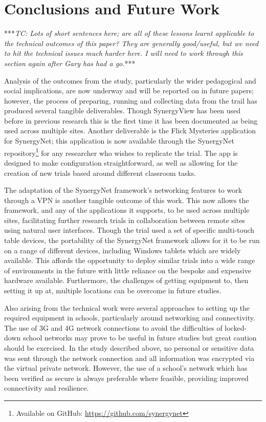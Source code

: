 \documentclass[a4paper,11pt]{article}
\begin{document}
\section{Conclusions and Future Work}

***{\emph{TC: Lots of short sentences here; are all of these lessons learnt applicable to the technical outcomes of this paper? They are generally good/useful, but we need to hit the technical issues much harder here. I will need to work through this section again after Gary has had a go.}}***

Analysis of the outcomes from the study, particularly the wider pedagogical and social implications, are now underway and will be reported on in future papers; however, the process of preparing, running and collecting data from the trail has produced several tangible deliverables.
Though SynergyView has been used before in previous research this is the first time it has been documented as being used across multiple sites.
Another deliverable is the Flick Mysteries application for SynergyNet; this application is now available through the SynergyNet repository\footnote{Available on GitHub: \url{https://github.com/synergynet}} for any researcher who wishes to replicate the trial.
The app is designed to make configuration straightforward, as well as allowing for the creation of new trials based around different classroom tasks.

The adaptation of the SynergyNet framework's networking features to work through a VPN is another tangible outcome of this work.
This now allows the framework, and any of the applications it supports, to be used across multiple sites, facilitating further research trials in collaboration between remote sites using natural user interfaces.
Though the trial used a set of specific multi-touch table devices, the portability of the SynergyNet framework allows for it to be run on a range of different devices, including Windows tablets which are widely available.
This affords the opportunity to deploy similar trials into a wide range of environments in the future with little reliance on the bespoke and expensive hardware available.
Furthermore, the challenges of getting equipment to, then setting it up at, multiple locations can be overcome in future studies.

Also arising from the technical work were several approaches to setting up the required equipment in schools, particularly around networking and connectivity.
The use of 3G and 4G network connections to avoid the difficulties of locked-down school networks may prove to be useful in future studies but great caution should be exercised.
In the study described above, no personal or sensitive data was sent through the network connection and all information was encrypted via the virtual private network.
However, the use of a school's network which has been verified as secure is always preferable where feasible, providing improved connectivity and resilience.
\end{document}
